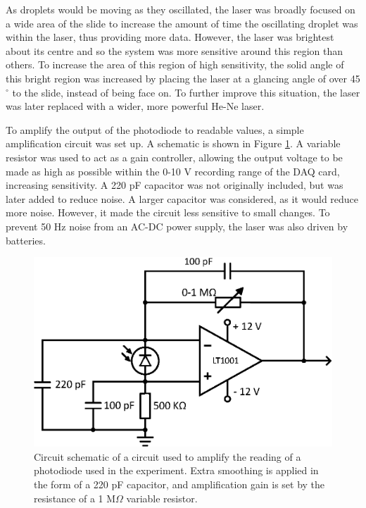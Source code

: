 \documentclass{physics_article_B}
\begin{document}
        As droplets would be moving as they oscillated, the laser was broadly focused on a wide area of the slide to increase the amount of time the oscillating droplet was within the laser, thus providing more data. However, the laser was brightest about its centre and so the system was more sensitive around this region than others. To increase the area of this region of high sensitivity, the solid angle of this bright region was increased by placing the laser at a glancing angle of over 45$^{\circ}$ to the slide, instead of being face on. To further improve this situation, the laser was later replaced with a wider, more powerful He-Ne laser.
        
        To amplify the output of the photodiode to readable values, a simple amplification circuit was set up\cite{artofelectronics}. A schematic is shown in Figure \ref{fig:PDCircuit}. A variable resistor was used to act as a gain controller, allowing the output voltage to be made as high as possible within the 0-10 V recording range of the DAQ card, increasing sensitivity. A 220 pF capacitor was not originally included, but was later added to reduce noise. A larger capacitor was considered, as it would reduce more noise. However, it made the circuit less sensitive to small changes. To prevent 50 Hz noise from an AC-DC power supply, the laser was also driven by batteries.
    
        \begin{figure}[H]
            \centering
            \includegraphics[scale=0.8]{Figures/PDCircuit.eps}
            \caption{Circuit schematic of a circuit used to amplify the reading of a photodiode used in the experiment. Extra smoothing is applied in the form of a 220 pF capacitor, and amplification gain is set by the resistance of a 1 M$\Omega$ variable resistor.}
            \label{fig:PDCircuit}
        \end{figure}
    
\end{document}

